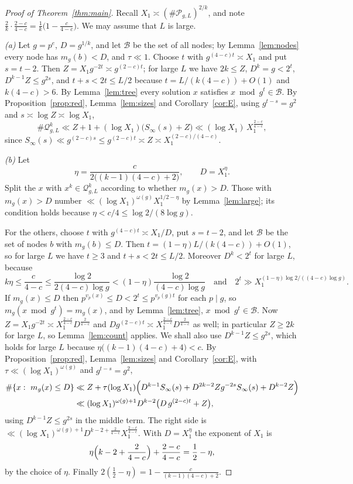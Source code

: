 \documentclass[11pt]{amsart}
\theoremstyle{definition}
\numberwithin{equation}{section}
\newcommand{\cP}{\mathcal{P}}
\newcommand{\cQ}{\mathcal{Q}}
\newcommand{\cB}{\mathcal{B}}
\newcommand{\Sinf}{S_\infty}
\begin{document}
\begin{proof}[Proof of Theorem~\ref{thm:main}]
Recall $X_1\asymp(\#\cP_{g,L})^{2/k}$, and note
$\frac2k\cdot\frac{2-c}{4-c}=\frac1k\bigl(1-\frac c{4-c}\bigr)$. We may assume
that $L$ is large.

\emph{(a)} Let $g=p^e$, $D=g^{1/k}$, and let $\cB$ be the set of all nodes;
by Lemma~\ref{lem:nodes} every node has $m_g(b)<D$, and $\tau\ll1$. Choose
$t$ with $g^{(4-c)t}\asymp X_1$ and put $s=t-2$. Then
$Z=X_1g^{-2t}\asymp g^{(2-c)t}$; for large $L$ we have $2k\le Z$,
$D^k=g<2^t$, $D^{k-1}Z\le g^{2s}$, and $t+s<2t\le L/2$ because
$t=L/(k(4-c))+O(1)$ and $k(4-c)>6$. By Lemma~\ref{lem:tree} every solution
$x$ satisfies $x\bmod g^t\in\cB$. By Proposition~\ref{prop:red},
Lemma~\ref{lem:sizes} and Corollary~\ref{cor:E}, using $g^{t-s}=g^2$ and
$s\asymp\log Z\asymp\log X_1$,
\[
\#\cQ^k_{g,L}\ll Z+1+(\log X_1)\bigl(\Sinf(s)+Z\bigr)\ll(\log X_1)\,X_1^{\frac{2-c}{4-c}} ,
\]
since $\Sinf(s)\ll g^{(2-c)s}\le g^{(2-c)t}\asymp Z\asymp X_1^{(2-c)/(4-c)}$.

\emph{(b)} Let
\[
\eta=\frac{c}{2\bigl((k-1)(4-c)+2\bigr)},\qquad D=X_1^\eta .
\]
Split the $x$ with $x^k\in\cQ^k_{g,L}$ according to whether $m_g(x)>D$.
Those with $m_g(x)>D$ number $\ll(\log X_1)^{\omega(g)}X_1^{1/2-\eta}$ by
Lemma~\ref{lem:large}; its condition holds because
$\eta<c/4\le\log2/(8\log g)$.

For the others, choose $t$ with $g^{(4-c)t}\asymp X_1/D$, put $s=t-2$, and
let $\cB$ be the set of nodes $b$ with $m_g(b)\le D$. Then
$t=(1-\eta)L/(k(4-c))+O(1)$, so for large $L$ we have $t\ge3$ and
$t+s<2t\le L/2$. Moreover $D^k<2^t$ for large $L$, because
\[
k\eta\le\frac c{4-c}\le\frac{\log2}{2(4-c)\log g}<(1-\eta)\frac{\log2}{(4-c)\log g}
\quad\text{and}\quad 2^t\gg X_1^{(1-\eta)\log2/((4-c)\log g)} .
\]
If $m_g(x)\le D$ then $p^{v_p(x)}\le D<2^t\le p^{v_p(g)t}$ for each
$p\mid g$, so $m_g(x\bmod g^t)=m_g(x)$, and by Lemma~\ref{lem:tree},
$x\bmod g^t\in\cB$. Now $Z=X_1g^{-2t}\asymp X_1^{\frac{2-c}{4-c}}D^{\frac2{4-c}}$
and $Dg^{(2-c)t}\asymp X_1^{\frac{2-c}{4-c}}D^{\frac2{4-c}}$ as well; in
particular $Z\ge2k$ for large $L$, so Lemma~\ref{lem:count} applies. We
shall also use $D^{k-1}Z\le g^{2s}$, which holds for large $L$ because
$\eta\bigl((k-1)(4-c)+4\bigr)<c$. By Proposition~\ref{prop:red},
Lemma~\ref{lem:sizes} and Corollary~\ref{cor:E}, with
$\tau\ll(\log X_1)^{\omega(g)}$ and $g^{t-s}=g^2$,
\begin{align*}
\#\{x:\ m_g(x)\le D\}&\ll Z+\tau(\log X_1)\Bigl(D^{k-1}\Sinf(s)+D^{2k-2}Zg^{-2s}\Sinf(s)+D^{k-2}Z\Bigr)\\
&\ll(\log X_1)^{\omega(g)+1}D^{k-2}\bigl(D\,g^{(2-c)t}+Z\bigr),
\end{align*}
using $D^{k-1}Z\le g^{2s}$ in the middle term. The right side is
$\ll(\log X_1)^{\omega(g)+1}D^{k-2+\frac2{4-c}}X_1^{\frac{2-c}{4-c}}$. With
$D=X_1^\eta$ the exponent of $X_1$ is
\[
\eta\Bigl(k-2+\frac2{4-c}\Bigr)+\frac{2-c}{4-c}=\frac12-\eta,
\]
by the choice of $\eta$. Finally
$2(\frac12-\eta)=1-\frac c{(k-1)(4-c)+2}$.
\end{proof}
\end{document}
